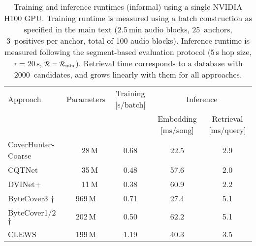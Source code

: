 \begin{table}[h]
\caption{Training and inference runtimes (informal) using a single NVIDIA H100 GPU. Training runtime is measured using a batch construction as specified in the main text (2.5\,min audio blocks, 25~anchors, 3~positives per anchor, total of 100 audio blocks). Inference runtime is measured following the segment-based evaluation protocol (5\,s hop size, $\tau=$20\,s, $\mathcal{R}=\mathcal{R}_{\text{min}}$). Retrieval time corresponds to a database with 2000~candidates, and grows linearly with them for all approaches.}
\label{tab:runtime}
\vskip 0.15in
\begin{center}
\begin{adjustbox}{max width=0.9\textwidth}
\begin{sc}
\begin{tabular}{lcccc}
\toprule
Approach & Parameters & Training [s/batch] & \multicolumn{2}{c}{Inference} \\
        \cline{4-5}
         &         &  & Embedding [ms/song]  & Retrieval [ms/query] \\
\midrule
CoverHunter-Coarse & ~~28\,M & 0.68  & 22.5 & 2.9 \\
CQTNet             & ~~35\,M & 0.48  & 57.6 & 2.0 \\
DVINet+            & ~~11\,M & 0.38  & 60.9 & 2.2 \\
ByteCover3 $\dag$  & 969\,M  & 0.71  & 27.4 & 5.1 \\
ByteCover1/2 $\dag$ & 202\,M & 0.50  & 62.2 & 5.1 \\
CLEWS              & 199\,M  & 1.19  & 40.3 & 3.5 \\
\bottomrule
\end{tabular}
\end{sc}
\end{adjustbox}
\end{center}
\end{table}


